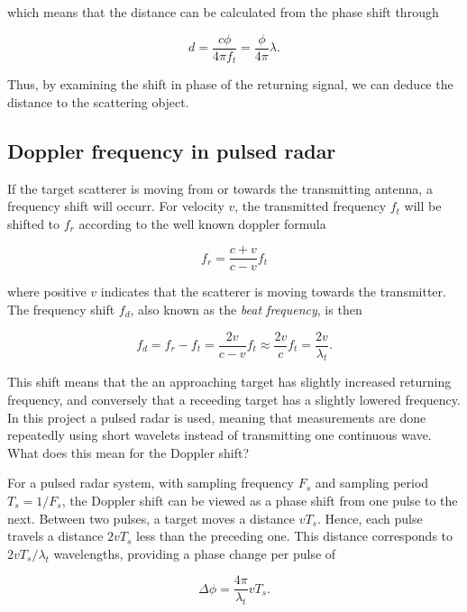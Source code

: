 which means that the distance can be calculated from the phase shift through

\begin{equation}
	d
	= \frac{c \phi}{4\pi f_t}
	= \frac{\phi}{4\pi}\lambda.
\end{equation}

Thus, by examining the shift in phase of the returning signal, we can deduce the distance to the scattering object. 

\subsection{Doppler frequency in pulsed radar}

If the target scatterer is moving from or towards the transmitting antenna, a frequency shift will occurr. For velocity $v$, the transmitted frequency $f_t$ will be shifted to $f_r$ according to the well known doppler formula \citep{ridenour_1947}

\begin{equation}
	f_r = \frac{c + v}{c - v}f_t
\end{equation}

where positive $v$ indicates that the scatterer is moving towards the transmitter. The frequency shift $f_d$, also known as the \emph{beat frequency}, is then

\begin{equation}\label{eq:dshift}
	f_d 
	= f_r - f_t 
	= \frac{2v}{c-v}f_t \approx \frac{2v}{c}f_t 
	= \frac{2v}{\lambda_t}.
\end{equation}

This shift means that the an approaching target has slightly increased returning frequency, and conversely that a receeding target has a slightly lowered frequency. In this project a pulsed radar is used, meaning that measurements are done repeatedly using short wavelets instead of transmitting one continuous wave. What does this mean for the Doppler shift?

For a pulsed radar system, with sampling frequency $F_s$ and sampling period $T_s = 1/F_s$, the Doppler shift can be viewed as a phase shift from one pulse to the next. Between two pulses, a target moves a distance $vT_s$. Hence, each pulse travels a distance $2vT_s$ less than the preceding one. This distance corresponds to $2vT_s/\lambda_t$ wavelengths, providing a phase change per pulse of

\begin{equation}
	\Delta \phi = \frac{4\pi}{\lambda_t}vT_s.
\end{equation}

